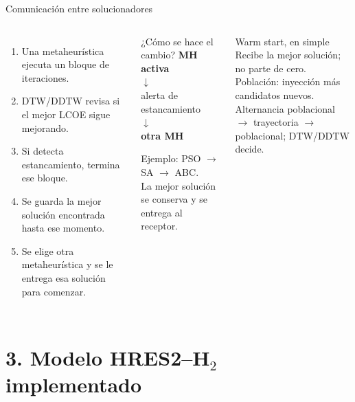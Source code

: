 \documentclass[aspectratio=169,11pt]{beamer}
\begin{document}
\begin{frame}{Comunicación entre solucionadores}
  \begin{columns}[T,onlytextwidth]
      \begin{enumerate}
        \item Una metaheurística ejecuta un bloque de iteraciones.
        \item DTW/DDTW revisa si el mejor LCOE sigue mejorando.
        \item Si detecta estancamiento, termina ese bloque.
        \item Se guarda la mejor solución encontrada hasta ese momento.
        \item Se elige otra metaheurística y se le entrega esa solución para comenzar.
      \end{enumerate}

      \begin{exampleblock}{¿Cómo se hace el cambio?}
        \centering
        \small
        \textbf{MH activa}\\
        $\downarrow$\\[-0.05cm]
        alerta de estancamiento\\[-0.05cm]
        $\downarrow$\\[-0.05cm]
        \textbf{otra MH}
        
        \vspace{0.12cm}
        {\scriptsize Ejemplo: PSO $\rightarrow$ SA $\rightarrow$ ABC.}\\[0.08cm]
        La mejor solución se conserva y se entrega al receptor.
      \end{exampleblock}

      \begin{block}{Warm start, en simple}
        \scriptsize
        Recibe la mejor solución; no parte de cero.\\
        Población: inyección más candidatos nuevos.\\
        Alternancia poblacional $\rightarrow$ trayectoria $\rightarrow$ poblacional;
        DTW/DDTW decide.
      \end{block}

  \end{columns}
\end{frame}

\section{3. Modelo HRES2--H$_2$ implementado}
\end{document}

